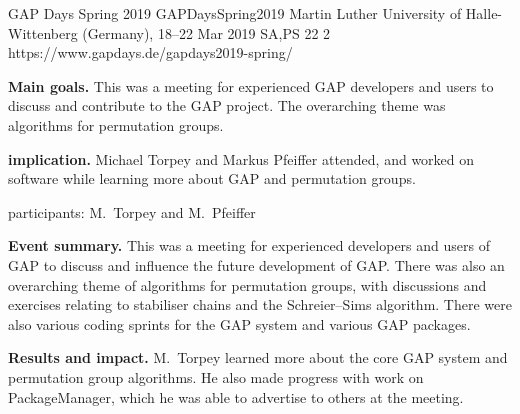 \begin{event}{GAP Days Spring 2019}
  {GAPDaysSpring2019}
  {Martin Luther University of Halle-Wittenberg (Germany), 18--22 Mar 2019}
  {SA,PS}
  {22}
  {2}
  {https://www.gapdays.de/gapdays2019-spring/}
  
\textbf{Main goals.} This was a meeting for experienced GAP developers and users
to discuss and contribute to the GAP project.  The overarching theme was
algorithms for permutation groups.

\textbf{\ODK implication.} Michael Torpey and Markus Pfeiffer attended, and
worked on software while learning more about GAP and permutation groups.

\ODK participants: M.~Torpey and M.~Pfeiffer

\textbf{Event summary.} This was a meeting for experienced developers and users
of GAP to discuss and influence the future development of GAP.  There was also
an overarching theme of algorithms for permutation groups, with discussions and
exercises relating to stabiliser chains and the Schreier--Sims algorithm.
There were also various coding sprints for the GAP system and various GAP
packages.

\textbf{Results and impact.} M.~Torpey learned more about the core GAP system
and permutation group algorithms.  He also made progress with work on
PackageManager, which he was able to advertise to others at the meeting.

\end{event}
